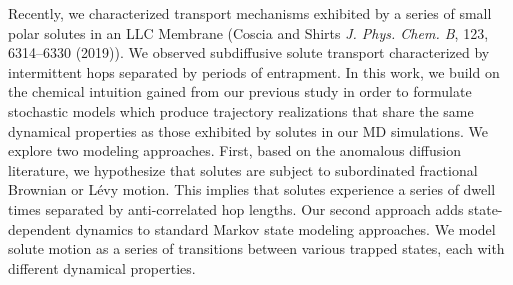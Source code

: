 \documentclass[fontsize=11pt]{article}
\begin{document}
	Recently, we characterized transport mechanisms exhibited by a series of 
	small polar solutes in an LLC Membrane (Coscia and Shirts \textit{J. Phys.
	Chem. B}, 123, 6314--6330 (2019)). We observed subdiffusive solute transport
	characterized by intermittent hops separated by periods of entrapment. In
	this work, we build on the chemical intuition gained from our previous study
	in order to formulate stochastic models which produce trajectory realizations
	that share the same dynamical properties as those exhibited by solutes in 
	our MD simulations. We explore two modeling approaches. First, based on the
	anomalous diffusion literature, we hypothesize that solutes are subject 
	to subordinated fractional Brownian or L\'evy motion. This implies that 
	solutes experience a series of dwell times separated by anti-correlated hop
	lengths. Our second approach adds state-dependent dynamics to standard Markov
	state modeling approaches. We model solute motion as a series of transitions
	between various trapped states, each with different dynamical properties.
	
	
\end{document}
